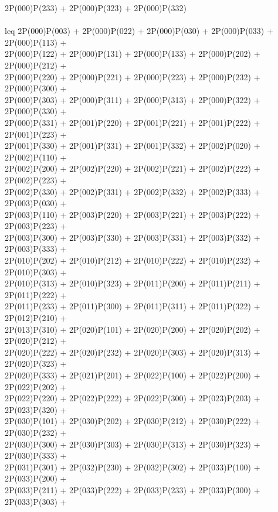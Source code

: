 2P(000)P(233) + 2P(000)P(323) + 2P(000)P(332) \\
\\leq
2P(000)P(003) + 2P(000)P(022) + 2P(000)P(030) + 2P(000)P(033) + 2P(000)P(113) +\\
2P(000)P(122) + 2P(000)P(131) + 2P(000)P(133) + 2P(000)P(202) + 2P(000)P(212) +\\
2P(000)P(220) + 2P(000)P(221) + 2P(000)P(223) + 2P(000)P(232) + 2P(000)P(300) +\\
2P(000)P(303) + 2P(000)P(311) + 2P(000)P(313) + 2P(000)P(322) + 2P(000)P(330) +\\
2P(000)P(331) + 2P(001)P(220) + 2P(001)P(221) + 2P(001)P(222) + 2P(001)P(223) +\\
2P(001)P(330) + 2P(001)P(331) + 2P(001)P(332) + 2P(002)P(020) + 2P(002)P(110) +\\
2P(002)P(200) + 2P(002)P(220) + 2P(002)P(221) + 2P(002)P(222) + 2P(002)P(223) +\\
2P(002)P(330) + 2P(002)P(331) + 2P(002)P(332) + 2P(002)P(333) + 2P(003)P(030) +\\
2P(003)P(110) + 2P(003)P(220) + 2P(003)P(221) + 2P(003)P(222) + 2P(003)P(223) +\\
2P(003)P(300) + 2P(003)P(330) + 2P(003)P(331) + 2P(003)P(332) + 2P(003)P(333) +\\
2P(010)P(202) + 2P(010)P(212) + 2P(010)P(222) + 2P(010)P(232) + 2P(010)P(303) +\\
2P(010)P(313) + 2P(010)P(323) + 2P(011)P(200) + 2P(011)P(211) + 2P(011)P(222) +\\
2P(011)P(233) + 2P(011)P(300) + 2P(011)P(311) + 2P(011)P(322) + 2P(012)P(210) +\\
2P(013)P(310) + 2P(020)P(101) + 2P(020)P(200) + 2P(020)P(202) + 2P(020)P(212) +\\
2P(020)P(222) + 2P(020)P(232) + 2P(020)P(303) + 2P(020)P(313) + 2P(020)P(323) +\\
2P(020)P(333) + 2P(021)P(201) + 2P(022)P(100) + 2P(022)P(200) + 2P(022)P(202) +\\
2P(022)P(220) + 2P(022)P(222) + 2P(022)P(300) + 2P(023)P(203) + 2P(023)P(320) +\\
2P(030)P(101) + 2P(030)P(202) + 2P(030)P(212) + 2P(030)P(222) + 2P(030)P(232) +\\
2P(030)P(300) + 2P(030)P(303) + 2P(030)P(313) + 2P(030)P(323) + 2P(030)P(333) +\\
2P(031)P(301) + 2P(032)P(230) + 2P(032)P(302) + 2P(033)P(100) + 2P(033)P(200) +\\
2P(033)P(211) + 2P(033)P(222) + 2P(033)P(233) + 2P(033)P(300) + 2P(033)P(303) +\\
